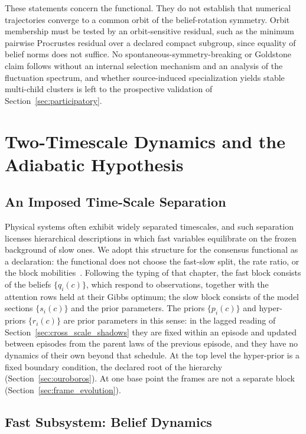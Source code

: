 \documentclass[11pt]{article}
\begin{document}
These statements concern the functional. They do not establish that numerical trajectories converge to a common orbit of the belief-rotation symmetry. Orbit membership must be tested by an orbit-sensitive residual, such as the minimum pairwise Procrustes residual over a declared compact subgroup, since equality of belief norms does not suffice. No spontaneous-symmetry-breaking or Goldstone claim follows without an internal selection mechanism and an analysis of the fluctuation spectrum, and whether source-induced specialization yields stable multi-child clusters is left to the prospective validation of Section~\ref{sec:participatory}.

\section{Two-Timescale Dynamics and the Adiabatic Hypothesis}\label{sec:timescales}

\subsection{An Imposed Time-Scale Separation}

Physical systems often exhibit widely separated timescales, and such separation licenses hierarchical descriptions in which fast variables equilibrate on the frozen background of slow ones. We adopt this structure for the consensus functional as a declaration: the functional does not choose the fast-slow split, the rate ratio, or the block mobilities~\cite[Ch.~8]{DennisGaugeVFE2026}. Following the typing of that chapter, the fast block consists of the beliefs $\{q_i(c)\}$, which respond to observations, together with the attention rows held at their Gibbs optimum; the slow block consists of the model sections $\{s_i(c)\}$ and the prior parameters. The priors $\{p_i(c)\}$ and hyper-priors $\{r_i(c)\}$ are prior parameters in this sense: in the lagged reading of Section~\ref{sec:cross_scale_shadows} they are fixed within an episode and updated between episodes from the parent laws of the previous episode, and they have no dynamics of their own beyond that schedule. At the top level the hyper-prior is a fixed boundary condition, the declared root of the hierarchy (Section~\ref{sec:ouroboros}). At one base point the frames are not a separate block (Section~\ref{sec:frame_evolution}).

\subsection{Fast Subsystem: Belief Dynamics}
\end{document}
